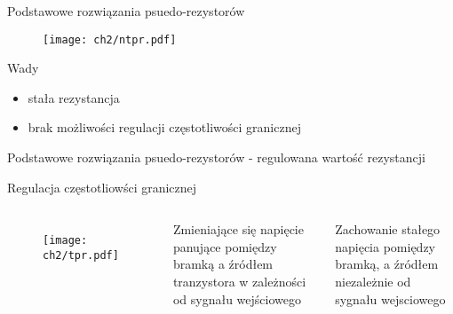
\begin{frame}{Podstawowe rozwiązania psuedo-rezystorów}


        \begin{figure}[H]
            \centering
            \texttt{[image: ch2/ntpr.pdf]}

        \end{figure}
        \vspace{-5mm} %
        \begin{alertblock}{Wady}
            \begin{itemize}
                \item stała rezystancja 
                \item brak możliwości regulacji częstotliwości granicznej
            \end{itemize}
        \end{alertblock}



\end{frame}

\begin{frame}{Podstawowe rozwiązania psuedo-rezystorów - regulowana wartość rezystancji}
    \begin{block}{}
        Regulacja częstotliowści granicznej
    \end{block}

    \begin{columns}
        \hspace{-10mm} %
        \begin{figure}[H]

            \texttt{[image: ch2/tpr.pdf]}

        \end{figure}
        \vspace{-5mm} \begin{alertblock}{}
        Zmieniające się napięcie panujące pomiędzy bramką a źródłem tranzystora w zależności od sygnału wejściowego
        \end{alertblock}
        \vspace{5mm} 
        \begin{exampleblock}{}
            Zachowanie stałego napięcia pomiędzy bramką, a źródłem niezależnie od sygnału wejsciowego 

        \end{exampleblock}
    \end{columns}


\end{frame}







